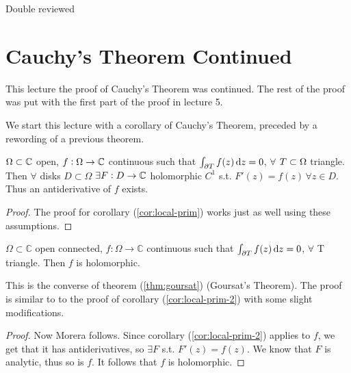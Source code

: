 \setcounter{section}{0}
\setcounter{theorem}{0}


Double reviewed

\section{Cauchy's Theorem Continued}

This lecture the proof of Cauchy's Theorem was continued. The rest of the proof was put with the first part of the proof in lecture 5.

We start this lecture with a corollary of Cauchy's Theorem, preceded by a rewording of a previous theorem.


\begin{corollary}\label{cor:local-prim-2}
$ \Omega \subset \mathbb{C} $ open, $f:\Omega \rightarrow \mathbb{C}$ continuous such that $\int_{\partial T} f(z) \dif z = 0$, $ \forall$ $T \subset \Omega$ triangle. Then $\forall$ disks $D\subset \Omega$ $\exists F:D\rightarrow \mathbb{C}$ holomorphic $C^1$ s.t. $F'(z)=f(z) \, \forall z\in D$. Thus an antiderivative of $f$ exists.
\end{corollary}

\begin{proof}
The proof for corollary (\ref{cor:local-prim}) works just as well using these assumptions.
\end{proof}


\begin{corollary}\label{cor:morera}
$\Omega \subset \mathbb{C}$ open connected, $f:\Omega \rightarrow \mathbb{C}$ continuous such that $\int_{\partial T} f(z) \dif z = 0$, $ \forall$ T triangle. Then $f$ is holomorphic.
\end{corollary}

\begin{note}
This is the converse of theorem (\ref{thm:goursat}) (Goursat's Theorem). The proof is similar to to the proof of corollary (\ref{cor:local-prim-2}) with some slight modifications.
\end{note}






\begin{proof} Now Morera follows. Since corollary (\ref{cor:local-prim-2}) applies to $f$, we get that it has antiderivatives, so $\exists F$ s.t. $F'(z)=f(z)$. We know that $F$ is analytic, thus so is $f$. It follows that $f$ is holomorphic.

\end{proof}





